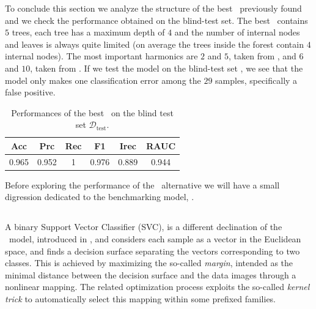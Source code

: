 
To conclude this section we analyze the structure of the best \rf\ previously found and we
check the performance obtained on the blind-test set. The best \rf\ contains $5$ trees, each tree
has a maximum depth of $4$ and the number of internal nodes and leaves is always quite limited (on
average the trees inside the forest contain $4$ internal nodes). The most important harmonics are
$2$ and $5$, taken from \cnmod, and $6$ and $10$, taken from \phin. If we test the model on the
blind-test set \db, we see that the model only makes one classification error among the $29$
samples, specifically a false positive.
\begin{table}[!ht]
	\caption{Performances of the best \rf\ on the blind test set $\mathscr
			D_\mathrm{test}$.}\label{tab:qrp-rf-test}

	\bigskip
	\setlength{\tabcolsep}{6pt}
	\centering
	\begin{tabular}{cccccc}
		\toprule
		\textbf{Acc} & \textbf{Prc} & \textbf{Rec} & \textbf{F1} & \textbf{Irec} & \textbf{RAUC} \\
		\midrule
		0.965        & 0.952        & 1            & 0.976       & 0.889         & 0.944         \\
		\bottomrule
	\end{tabular}
\end{table}

Before exploring the performance of the \rf\ alternative we will have a small digression dedicated
to the benchmarking model, \svcs.

\subsection{\svc}
A binary Support Vector Classifier (SVC), is a different declination of the \svm\ model, introduced
in , and considers each sample as a vector in the Euclidean space, and finds a decision surface separating the vectors corresponding to two classes. This is achieved by maximizing the so-called \emph{margin}, intended as the minimal distance between the decision surface and the data images through a nonlinear mapping. The related optimization process exploits the so-called \emph{kernel trick} to automatically select this mapping within some prefixed families.

